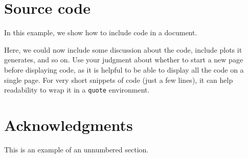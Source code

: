 \documentclass{article}
\begin{document}
\section{Source code}\label{s-code}

In this example, we show how to include code in a document.

Here, we could now include some discussion about the code, include plots it generates, and so on. Use your judgment about whether to start a new page before displaying code, as it is helpful to be able to display all the code on a single page.
For very short snippets of code (just a few lines), it can help readability to wrap it in a \texttt{quote} environment.

\section*{Acknowledgments}
This is an example of an unnumbered section.

\newpage

\end{document}
